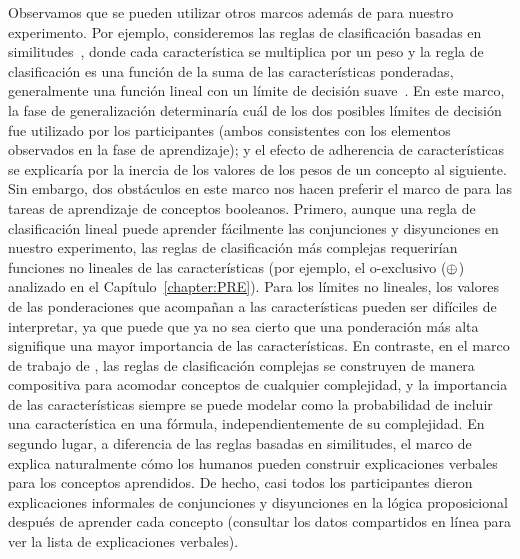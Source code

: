 Observamos que se pueden utilizar otros marcos además de \lot para nuestro experimento. Por ejemplo, consideremos las reglas de clasificación basadas en similitudes~\cite{juslin2003cue, juslin2003exemplar}, donde cada característica se multiplica por un peso y la regla de clasificación es una función de la suma de las características ponderadas, generalmente una función lineal con un límite de decisión suave~\cite{juslin2003exemplar}. En este marco, la fase de generalización determinaría cuál de los dos posibles límites de decisión fue utilizado por los participantes (ambos consistentes con los elementos observados en la fase de aprendizaje); y el efecto de adherencia de características se explicaría por la inercia de los valores de los pesos de un concepto al siguiente. Sin embargo, dos obstáculos en este marco nos hacen preferir el marco de \lot para las tareas de aprendizaje de conceptos booleanos. Primero, aunque una regla de clasificación lineal puede aprender fácilmente las conjunciones y disyunciones en nuestro experimento, las reglas de clasificación más complejas requerirían funciones no lineales de las características (por ejemplo, el o-exclusivo ($\oplus$) analizado en el Capítulo~\ref{chapter:PRE}). Para los límites no lineales, los valores de las ponderaciones que acompañan a las características pueden ser difíciles de interpretar, ya que puede que ya no sea cierto que una ponderación más alta signifique una mayor importancia de las características. En contraste, en el marco de trabajo de \lot, las reglas de clasificación complejas se construyen de manera compositiva para acomodar conceptos de cualquier complejidad, y la importancia de las características siempre se puede modelar como la probabilidad de incluir una característica en una fórmula, independientemente de su complejidad. En segundo lugar, a diferencia de las reglas basadas en similitudes, el marco de \lot explica naturalmente cómo los humanos pueden construir explicaciones verbales para los conceptos aprendidos. De hecho, casi todos los participantes dieron explicaciones informales de conjunciones y disyunciones en la lógica proposicional después de aprender cada concepto (consultar los datos compartidos en línea para ver la lista de explicaciones verbales).


